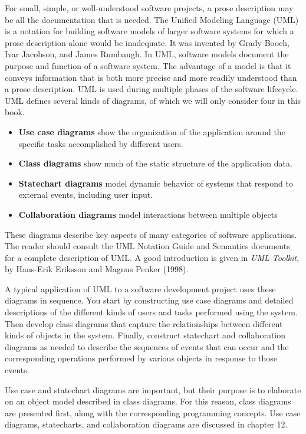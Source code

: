 For small, simple, or well-understood software projects, a prose description
may be all the documentation that is needed. The Unified Modeling Language
(UML) is a notation for building software models of larger software
systems for which a prose description alone would be inadequate. It was
invented by Grady Booch, Ivar Jacobson, and James Rumbaugh. In UML, software
models document the purpose and function of a software system.
The advantage of a model is that it conveys
information that is both more precise and more readily understood than
a prose description. UML is used during multiple phases of the software
lifecycle. UML defines several kinds of diagrams, of which we will only
consider four in this book.

\begin{itemize}
\item \textbf{Use case diagrams} show the organization of the
application around the specific tasks accomplished by different users.
\item \textbf{Class diagrams} show much of the static structure of the
application data.
\item \textbf{Statechart diagrams} model dynamic behavior of systems
that respond to external events, including user input.
\item \textbf{Collaboration diagrams} model interactions between
multiple objects
\end{itemize}
These diagrams describe key aspects of many categories of software
applications. The reader should consult the UML Notation Guide and
Semantics documents for a complete description of UML. A good
introduction is given in \textit{UML Toolkit}, by Hans-Erik Eriksson
and Magnus Penker (1998).

A typical application of UML to a software development project uses
these diagrams in sequence. You start by constructing
use case diagrams and detailed descriptions of the different kinds of
users and tasks performed using the system. Then develop class diagrams
that capture the relationships between different kinds of objects
in the system. Finally, construct statechart and
collaboration diagrams as needed to describe the sequences of events
that can occur and the corresponding operations performed by various
objects in response to those events.

Use case and statechart diagrams are important, but their purpose is
to elaborate on an object model described in class diagrams. For this
reason, class diagrams are
presented first, along with the corresponding programming
concepts. Use case diagrams, statecharts, and collaboration diagrams
are discussed in chapter 12.

